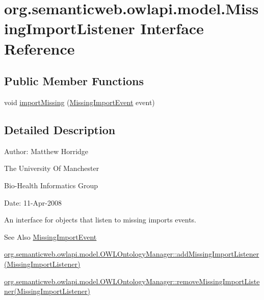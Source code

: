 \hypertarget{interfaceorg_1_1semanticweb_1_1owlapi_1_1model_1_1_missing_import_listener}{\section{org.\-semanticweb.\-owlapi.\-model.\-Missing\-Import\-Listener Interface Reference}
\label{interfaceorg_1_1semanticweb_1_1owlapi_1_1model_1_1_missing_import_listener}
}
\subsection*{Public Member Functions}
\begin{DoxyCompactItemize}
\item 
void \hyperlink{interfaceorg_1_1semanticweb_1_1owlapi_1_1model_1_1_missing_import_listener_ae0cc62b69dbc761d5ae47946b2ac050d}{import\-Missing} (\hyperlink{classorg_1_1semanticweb_1_1owlapi_1_1model_1_1_missing_import_event}{Missing\-Import\-Event} event)
\end{DoxyCompactItemize}


\subsection{Detailed Description}
Author\-: Matthew Horridge\par
 The University Of Manchester\par
 Bio-\/\-Health Informatics Group\par
 Date\-: 11-\/\-Apr-\/2008\par
\par
 

An interface for objects that listen to missing imports events. \begin{DoxySeeAlso}{See Also}
\hyperlink{classorg_1_1semanticweb_1_1owlapi_1_1model_1_1_missing_import_event}{Missing\-Import\-Event} 

\hyperlink{interfaceorg_1_1semanticweb_1_1owlapi_1_1model_1_1_o_w_l_ontology_manager_abb23ff4fc924d66c86e91f70eb74c7b2}{org.\-semanticweb.\-owlapi.\-model.\-O\-W\-L\-Ontology\-Manager\-::add\-Missing\-Import\-Listener(\-Missing\-Import\-Listener)} 

\hyperlink{interfaceorg_1_1semanticweb_1_1owlapi_1_1model_1_1_o_w_l_ontology_manager_a9fd0733a82b90286f7578d48270d7256}{org.\-semanticweb.\-owlapi.\-model.\-O\-W\-L\-Ontology\-Manager\-::remove\-Missing\-Import\-Listener(\-Missing\-Import\-Listener)} 
\end{DoxySeeAlso}


